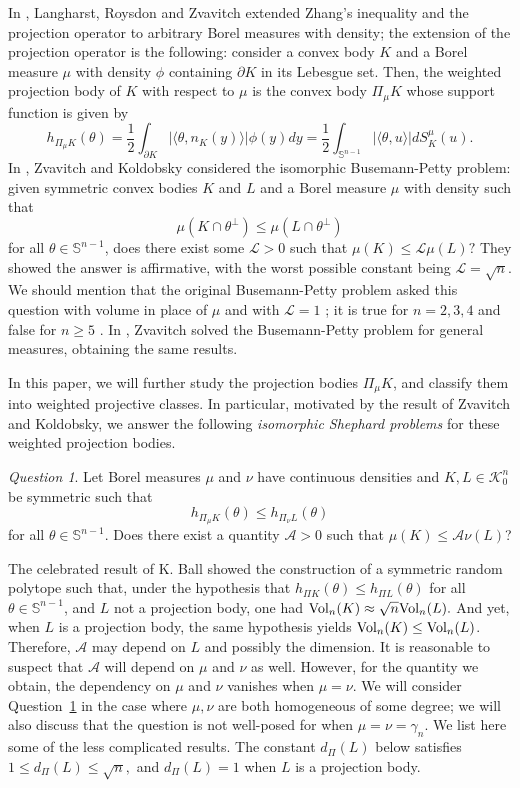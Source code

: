 \documentclass[11pt]{amsart}
\theoremstyle{definition}
\theoremstyle{remark}
\newtheorem{question}[theorem]{Question}
\numberwithin{equation}{section}
\newcommand{\s}{\mathbb{S}}
\newcommand{\conbod}{\mathcal{K}^n}
\newcommand{\vol}{\text{\rm Vol}}
\begin{document}
In \cite{LRZ22}, Langharst, Roysdon and Zvavitch extended Zhang's inequality and the projection operator to arbitrary Borel measures with density; the extension of the projection operator is the following:
consider a convex body $K$ and a Borel measure $\mu$ with density $\phi$ containing $\partial K$ in its Lebesgue set. Then, the weighted projection body of $K$ with respect to $\mu$ is the convex body $\Pi_{\mu} K$ whose support function is given by
\begin{equation}
    h_{\Pi_{\mu} K}(\theta) = \frac{1}{2} \int_{\partial K} |\langle \theta,n_K(y)\rangle|\phi(y) dy=\frac{1}{2}\int_{\s^{n-1}}|\langle \theta, u \rangle|dS^{\mu}_{K}(u).
\end{equation}
In \cite{KZ15}, Zvavitch and Koldobsky considered the isomorphic Busemann-Petty problem: given symmetric convex bodies $K$ and $L$ and a Borel measure $\mu$ with density such that $$\mu(K\cap \theta^\perp) \leq \mu(L\cap \theta^\perp)$$
for all $\theta\in\s^{n-1}$, does there exist some $\mathcal{L}>0$ such that $\mu(K)\leq \mathcal{L}\mu(L)?$ They showed the answer is affirmative, with the worst possible constant being $\mathcal{L}=\sqrt{n}.$ We should mention that the original Busemann-Petty problem asked this question with volume in place of $\mu$ and with $\mathcal{L}=1$ \cite{BP56}; it is true for $n=2,3,4$ and false for $n\geq 5$ \cite{Ball87,BJ91, GR94, GKS99,GKS99_2, AG90, RL75,MP92,GZ93,GZ94}. In \cite{Zv05}, Zvavitch solved the Busemann-Petty problem for general measures, obtaining the same results. 

In this paper, we will further study the projection bodies $\Pi_\mu K$, and classify them into weighted projective classes. In particular, motivated by the result of Zvavitch and Koldobsky, we answer the following \textit{isomorphic Shephard problems} for these weighted projection bodies.
 \begin{question}
\label{q:shep_meas}
Let Borel measures $\mu$ and $\nu$ have continuous densities and $K,L\in\conbod_0$ be symmetric such that
$$h_{\Pi_{\mu} K}(\theta)\leq h_{\Pi_{\nu} L}(\theta)$$ for all $\theta\in\s^{n-1}$. Does there exist a quantity $\mathcal{A}>0$ such that $\mu(K)\leq \mathcal{A}\nu(L)$?
\end{question}

The celebrated result of K. Ball \cite{Ball91_0} showed the construction of a symmetric random polytope such that, under the hypothesis that $h_{\Pi K}(\theta)\le h_{\Pi L}(\theta)$ for all $\theta\in \s^{n-1}$, and $L$ not a projection body, one had $\vol_n(K)\approx \sqrt{n}\vol_n(L).$  And yet, when $L$ is a projection body, the same hypothesis yields $\vol_n(K)\le \vol_n(L)$. Therefore, $\mathcal{A}$ may depend on $L$ and possibly the dimension. It is reasonable to suspect that $\mathcal{A}$ will depend on $\mu$ and $\nu$ as well. However, for the quantity we obtain, the dependency on $\mu$ and $\nu$ vanishes when $\mu=\nu$. We will consider Question~\ref{q:shep_meas} in the case where $\mu,\nu$ are both homogeneous of some degree; we will also discuss that the question is not well-posed for when $\mu=\nu=\gamma_n$. We list here some of the less complicated results. The constant $d_{\Pi}(L)$ below satisfies $1\leq d_{\Pi}(L)\leq \sqrt{n},$ and  $d_{\Pi}(L)=1$ when $L$ is a projection body.
\end{document}
